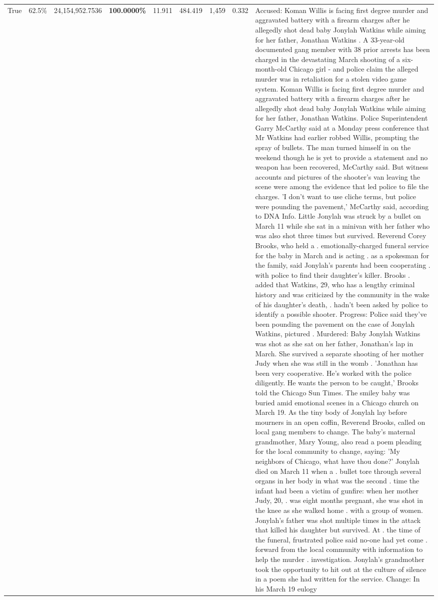 \begin{table}[H]
\begin{tabular}{lllrlllll}
True & 62.5\% & 24,154,952.7536 & \bfseries \color{red} 100.0000\% & 11.911 & 484.419 & 1,459 & 0.332 & Accused: Koman Willis is facing first degree murder and aggravated battery with a firearm charges after he allegedly shot dead baby Jonylah Watkins while aiming for her father, Jonathan Watkins . A 33-year-old documented gang member with 38 prior arrests has been charged in the devastating March shooting of a six-month-old Chicago girl - and police claim the alleged murder was in retaliation for a stolen video game system. Koman Willis is facing first degree murder and aggravated battery with a firearm charges after he allegedly shot dead baby Jonylah Watkins while aiming for her father, Jonathan Watkins. Police Superintendent Garry McCarthy said at a Monday press conference that Mr Watkins had earlier robbed Willis, prompting the spray of bullets. The man turned himself in on the weekend though he is yet to provide a statement and no weapon has been recovered, McCarthy said. But witness accounts and pictures of the shooter's van leaving the scene were among the evidence that led police to file the charges. 'I don't want to use cliche terms, but police were pounding the pavement,' McCarthy said, according to DNA Info. Little Jonylah was struck by a bullet on March 11 while she sat in a minivan with her father who was also shot three times but survived. Reverend Corey Brooks, who held a . emotionally-charged funeral service for the baby in March and is acting . as a spokesman for the family, said Jonylah's parents had been cooperating . with police to find their daughter's killer. Brooks . added that Watkins, 29, who has a lengthy criminal history and was criticized by the community in the wake of his daughter's death, . hadn't been asked by police to identify a possible shooter. Progress: Police said they've been pounding the pavement on the case of Jonylah Watkins, pictured . Murdered: Baby Jonylah Watkins was shot as she sat on her father, Jonathan's lap in March. She survived a separate shooting of her mother Judy when she was still in the womb . 'Jonathan has been very cooperative. He's worked with the police diligently. He wants the person to be caught,' Brooks told the Chicago Sun Times. The smiley baby was buried amid emotional scenes in a Chicago church on March 19. As the tiny body of Jonylah lay before mourners in an open coffin, Reverend Brooks, called on local gang members to change. The baby's maternal grandmother, Mary Young, also read a poem pleading for the local community to change, saying: 'My neighbors of Chicago, what have thou done?' Jonylah died on March 11 when a . bullet tore through several organs in her body in what was the second . time the infant had been a victim of gunfire: when her mother Judy, 20, . was eight months pregnant, she was shot in the knee as she walked home . with a group of women. Jonylah's father was shot multiple times in the attack that killed his daughter but survived. At . the time of the funeral, frustrated police said no-one had yet come . forward from the local community with information to help the murder . investigation. Jonylah's grandmother took the opportunity to hit out at the culture of silence in a poem she had written for the service. Change: In his March 19 eulogy 
\end{tabular}
\end{table}
